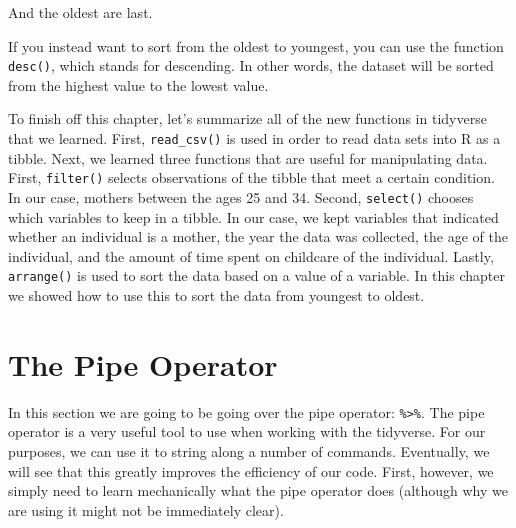 \documentclass[
]{book}
\newenvironment{Shaded}{\begin{snugshade}}{\end{snugshade}}
\newcommand{\DecValTok}[1]{\textcolor[rgb]{0.00,0.00,0.81}{#1}}
\newcommand{\FunctionTok}[1]{\textcolor[rgb]{0.13,0.29,0.53}{\textbf{#1}}}
\newcommand{\NormalTok}[1]{#1}
\newcommand{\OtherTok}[1]{\textcolor[rgb]{0.56,0.35,0.01}{#1}}
\newcommand{\SpecialCharTok}[1]{\textcolor[rgb]{0.81,0.36,0.00}{\textbf{#1}}}
\begin{document}
And the oldest are last.

\begin{Shaded}
\end{Shaded}

If you instead want to sort from the oldest to youngest, you can use the function \texttt{desc()}, which stands for descending. In other words, the dataset will be sorted from the highest value to the lowest value.

\begin{Shaded}
\end{Shaded}

To finish off this chapter, let's summarize all of the new functions in tidyverse that we learned. First, \texttt{read\_csv()} is used in order to read data sets into R as a tibble. Next, we learned three functions that are useful for manipulating data. First, \texttt{filter()} selects observations of the tibble that meet a certain condition. In our case, mothers between the ages 25 and 34. Second, \texttt{select()} chooses which variables to keep in a tibble. In our case, we kept variables that indicated whether an individual is a mother, the year the data was collected, the age of the individual, and the amount of time spent on childcare of the individual. Lastly, \texttt{arrange()} is used to sort the data based on a value of a variable. In this chapter we showed how to use this to sort the data from youngest to oldest.

\section{The Pipe Operator}\label{the-pipe-operator}

In this section we are going to be going over the pipe operator: \texttt{\%\textgreater{}\%}. The pipe operator is a very useful tool to use when working with the tidyverse. For our purposes, we can use it to string along a number of commands. Eventually, we will see that this greatly improves the efficiency of our code. First, however, we simply need to learn mechanically what the pipe operator does (although why we are using it might not be immediately clear).
\end{document}
